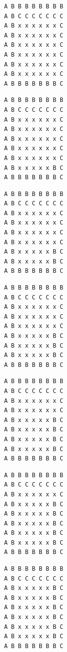{ \begin{verbatim}
         A B B B B B B B B
         A B C C C C C C C
         A B x x x x x x C
         A B x x x x x x C
         A B x x x x x x C
         A B x x x x x x C
         A B x x x x x x C
         A B x x x x x x C
         A B B B B B B B C
\end{verbatim} }

{ \begin{verbatim}
         A B B B B B B B B
         A B C C C C C C C
         A B x x x x x x C
         A B x x x x x x C
         A B x x x x x x C
         A B x x x x x x C
         A B x x x x x x C
         A B x x x x x B C
         A B B B B B B B C
\end{verbatim} }

{ \begin{verbatim}
         A B B B B B B B B
         A B C C C C C C C
         A B x x x x x x C
         A B x x x x x x C
         A B x x x x x x C
         A B x x x x x x C
         A B x x x x x B C
         A B x x x x x B C
         A B B B B B B B C
\end{verbatim} }

{ \begin{verbatim}
         A B B B B B B B B
         A B C C C C C C C
         A B x x x x x x C
         A B x x x x x x C
         A B x x x x x x C
         A B x x x x x B C
         A B x x x x x B C
         A B x x x x x B C
         A B B B B B B B C
\end{verbatim} }

{ \begin{verbatim}
         A B B B B B B B B
         A B C C C C C C C
         A B x x x x x x C
         A B x x x x x x C
         A B x x x x x B C
         A B x x x x x B C
         A B x x x x x B C
         A B x x x x x B C
         A B B B B B B B C
\end{verbatim} }

{ \begin{verbatim}
         A B B B B B B B B
         A B C C C C C C C
         A B x x x x x x C
         A B x x x x x B C
         A B x x x x x B C
         A B x x x x x B C
         A B x x x x x B C
         A B x x x x x B C
         A B B B B B B B C
\end{verbatim} }

{ \begin{verbatim}
         A B B B B B B B B
         A B C C C C C C C
         A B x x x x x B C
         A B x x x x x B C
         A B x x x x x B C
         A B x x x x x B C
         A B x x x x x B C
         A B x x x x x B C
         A B B B B B B B C
\end{verbatim} }

